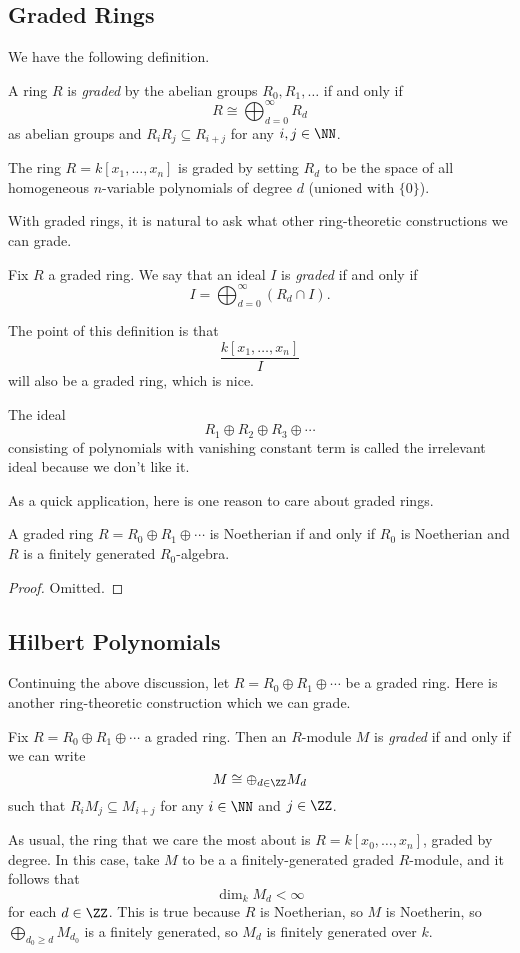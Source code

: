 \subsection{Graded Rings}
We have the following definition.
\begin{definition}
	A ring $R$ is \textit{graded} by the abelian groups $R_0,R_1,\ldots$ if and only if
	\[R\cong\bigoplus_{d=0}^\infty R_d\]
	as abelian groups and $R_iR_j\subseteq R_{i+j}$ for any $i,j\in\NN$.
\end{definition}
\begin{example}
	The ring $R=k[x_1,\ldots,x_n]$ is graded by setting $R_d$ to be the space of all homogeneous $n$-variable polynomials of degree $d$ (unioned with $\{0\}$).
\end{example}
With graded rings, it is natural to ask what other ring-theoretic constructions we can grade.
\begin{definition}
	Fix $R$ a graded ring. We say that an ideal $I$ is \textit{graded} if and only if
	\[I=\bigoplus_{d=0}^\infty(R_d\cap I).\]
\end{definition}
The point of this definition is that
\[\frac{k[x_1,\ldots,x_n]}I\]
will also be a graded ring, which is nice.

The ideal
\[R_1\oplus R_2\oplus R_3\oplus\cdots\]
consisting of polynomials with vanishing constant term is called the irrelevant ideal because we don't like it.

As a quick application, here is one reason to care about graded rings.
\begin{proposition}
	A graded ring $R=R_0\oplus R_1\oplus\cdots$ is Noetherian if and only if $R_0$ is Noetherian and $R$ is a finitely generated $R_0$-algebra.
\end{proposition}
\begin{proof}
	Omitted.\todo{}
\end{proof}

\subsection{Hilbert Polynomials}
Continuing the above discussion, let $R=R_0\oplus R_1\oplus\cdots$ be a graded ring. Here is another ring-theoretic construction which we can grade.
\begin{definition}
	Fix $R=R_0\oplus R_1\oplus\cdots$ a graded ring. Then an $R$-module $M$ is \textit{graded} if and only if we can write
	\[M\cong\oplus_{d\in\ZZ}M_d\]
	such that $R_iM_j\subseteq M_{i+j}$ for any $i\in\NN$ and $j\in\ZZ$.
\end{definition}
As usual, the ring that we care the most about is $R=k[x_0,\ldots,x_n]$, graded by degree. In this case, take $M$ to be a a finitely-generated graded $R$-module, and it follows that
\[\dim_kM_d<\infty\]
for each $d\in\ZZ$. This is true because $R$ is Noetherian, so $M$ is Noetherin, so $\bigoplus_{d_0\ge d}M_{d_0}$ is a finitely generated, so $M_d$ is finitely generated over $k$.

